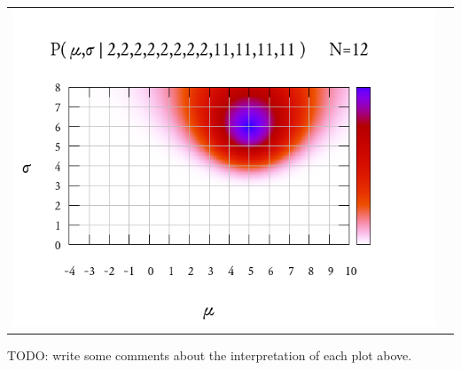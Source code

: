 \begin{tabular}{ll}
	\includegraphics{bayes6.png}\\
\end{tabular}


TODO: write some comments about the interpretation of each plot above.


